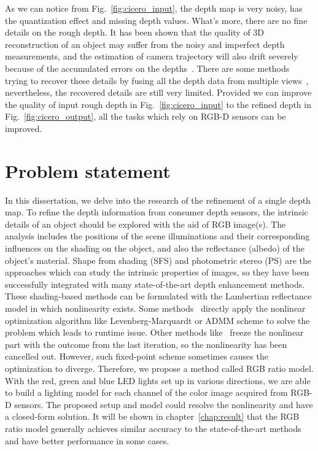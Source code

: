As we can notice from Fig.~\ref{fig:cicero_input}, the depth map is very noisy, has the quantization effect and missing depth values.
What's more, there are no fine details on the rough depth.
It has been shown that the quality of 3D reconstruction of an object may suffer from the noisy and imperfect depth measurements, and the estimation of camera trajectory will also drift severely because of the accumulated errors on the depths~\cite{maier2013thesis}.
There are some methods trying to recover these details by fusing all the depth data from multiple views~\cite{newcombe2011kinectfusion}, nevertheless, the recovered details are still very limited.
Provided we can improve the quality of input rough depth in Fig.~\ref{fig:cicero_input} to the refined depth in Fig.~\ref{fig:cicero_output}, all the tasks which rely on RGB-D sensors can be improved. 

\section{Problem statement}

In this dissertation, we delve into the research of the refinement of a single depth map.
To refine the depth information from consumer depth sensors, the intrinsic details of an object should be explored with the aid of RGB image(s).
The analysis includes the positions of the scene illuminations and their corresponding influences on the shading on the object, and also the reflectance (albedo) of the object's material.
Shape from shading (SFS) and photometric stereo (PS) are the approaches which can study the intrinsic properties of images, so they have been successfully integrated with many state-of-the-art depth enhancement methods.
These shading-based methods can be formulated with the Lambertian reflectance model in which nonlinearity exists. 
Some methods~\cite{wu2014real, or2016real} directly apply the nonlinear optimization algorithm like Levenberg-Marquardt or ADMM scheme to solve the problem which leads to runtime issue. 
Other methods like~\cite{or2015rgbd} freeze the nonlinear part with the outcome from the last iteration, so the nonlinearity has been cancelled out.
However, such fixed-point scheme sometimes causes the optimization to diverge.
Therefore, we propose a method called RGB ratio model.
With the red, green and blue LED lights set up in various directions, we are able to build a lighting model for each channel of the color image acquired from RGB-D sensors.
The proposed setup and model could resolve the nonlinearity and have a closed-form solution. 
It will be shown in chapter~\ref{chap:result} that the RGB ratio model generally achieves similar accuracy to the state-of-the-art methods and have better performance in some cases.


